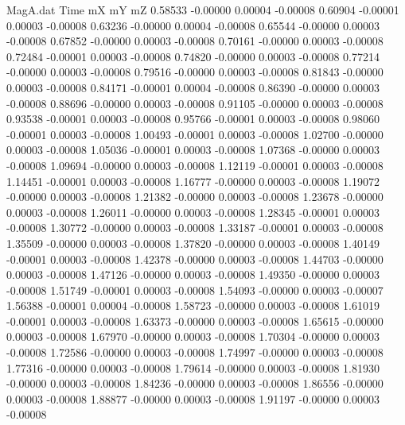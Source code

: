 \begin{filecontents}{MagA.dat}
Time mX mY mZ
   0.58533   -0.00000    0.00004   -0.00008
   0.60904   -0.00001    0.00003   -0.00008
   0.63236   -0.00000    0.00004   -0.00008
   0.65544   -0.00000    0.00003   -0.00008
   0.67852   -0.00000    0.00003   -0.00008
   0.70161   -0.00000    0.00003   -0.00008
   0.72484   -0.00001    0.00003   -0.00008
   0.74820   -0.00000    0.00003   -0.00008
   0.77214   -0.00000    0.00003   -0.00008
   0.79516   -0.00000    0.00003   -0.00008
   0.81843   -0.00000    0.00003   -0.00008
   0.84171   -0.00001    0.00004   -0.00008
   0.86390   -0.00000    0.00003   -0.00008
   0.88696   -0.00000    0.00003   -0.00008
   0.91105   -0.00000    0.00003   -0.00008
   0.93538   -0.00001    0.00003   -0.00008
   0.95766   -0.00001    0.00003   -0.00008
   0.98060   -0.00001    0.00003   -0.00008
   1.00493   -0.00001    0.00003   -0.00008
   1.02700   -0.00000    0.00003   -0.00008
   1.05036   -0.00001    0.00003   -0.00008
   1.07368   -0.00000    0.00003   -0.00008
   1.09694   -0.00000    0.00003   -0.00008
   1.12119   -0.00001    0.00003   -0.00008
   1.14451   -0.00001    0.00003   -0.00008
   1.16777   -0.00000    0.00003   -0.00008
   1.19072   -0.00000    0.00003   -0.00008
   1.21382   -0.00000    0.00003   -0.00008
   1.23678   -0.00000    0.00003   -0.00008
   1.26011   -0.00000    0.00003   -0.00008
   1.28345   -0.00001    0.00003   -0.00008
   1.30772   -0.00000    0.00003   -0.00008
   1.33187   -0.00001    0.00003   -0.00008
   1.35509   -0.00000    0.00003   -0.00008
   1.37820   -0.00000    0.00003   -0.00008
   1.40149   -0.00001    0.00003   -0.00008
   1.42378   -0.00000    0.00003   -0.00008
   1.44703   -0.00000    0.00003   -0.00008
   1.47126   -0.00000    0.00003   -0.00008
   1.49350   -0.00000    0.00003   -0.00008
   1.51749   -0.00001    0.00003   -0.00008
   1.54093   -0.00000    0.00003   -0.00007
   1.56388   -0.00001    0.00004   -0.00008
   1.58723   -0.00000    0.00003   -0.00008
   1.61019   -0.00001    0.00003   -0.00008
   1.63373   -0.00000    0.00003   -0.00008
   1.65615   -0.00000    0.00003   -0.00008
   1.67970   -0.00000    0.00003   -0.00008
   1.70304   -0.00000    0.00003   -0.00008
   1.72586   -0.00000    0.00003   -0.00008
   1.74997   -0.00000    0.00003   -0.00008
   1.77316   -0.00000    0.00003   -0.00008
   1.79614   -0.00000    0.00003   -0.00008
   1.81930   -0.00000    0.00003   -0.00008
   1.84236   -0.00000    0.00003   -0.00008
   1.86556   -0.00000    0.00003   -0.00008
   1.88877   -0.00000    0.00003   -0.00008
   1.91197   -0.00000    0.00003   -0.00008

\end{filecontents}
